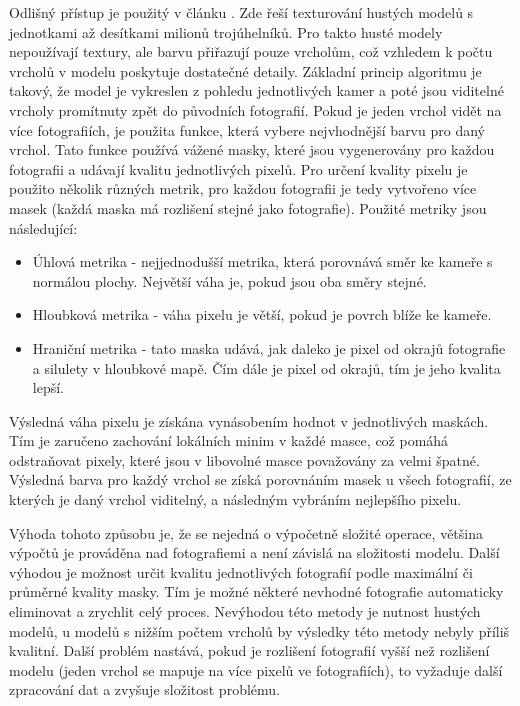 \documentclass[11pt,twoside,a4paper]{book}
\begin{document}
Odlišný přístup je použitý v článku \cite{masked-blending}. Zde řeší texturování
hustých modelů s jednotkami až desítkami milionů trojúhelníků. Pro takto husté
modely nepoužívají textury, ale barvu přiřazují pouze vrcholům, což vzhledem k
počtu vrcholů v modelu poskytuje dostatečné detaily. Základní princip algoritmu
je takový, že model je vykreslen z pohledu jednotlivých kamer a poté jsou
viditelné vrcholy promítnuty zpět do původních fotografií. Pokud je jeden vrchol
vidět na více fotografiích, je použita funkce, která vybere nejvhodnější barvu
pro daný vrchol. Tato funkce používá vážené masky, které jsou vygenerovány pro
každou fotografii a udávají kvalitu jednotlivých pixelů. Pro určení kvality
pixelu je použito několik různých metrik, pro každou fotografii je tedy
vytvořeno více masek (každá maska má rozlišení stejné jako fotografie). Použité
metriky jsou následující:
\begin{itemize}
  \item Úhlová metrika - nejjednodušší metrika, která porovnává směr ke kameře s 
  		normálou plochy. Největší váha je, pokud jsou oba směry stejné.
  \item Hloubková metrika - váha pixelu je větší, pokud je povrch blíže ke 
  		kameře.
  \item Hraniční metrika - tato maska udává, jak daleko je pixel od okrajů 
  		fotografie a silulety v hloubkové mapě. Čím dále je pixel od okrajů, 
  		tím je jeho kvalita lepší.
\end{itemize}
Výsledná váha pixelu je získána vynásobením hodnot v jednotlivých maskách. Tím 
je zaručeno zachování lokálních minim v každé masce, což pomáhá odstraňovat 
pixely, které jsou v libovolné masce považovány za velmi špatné. Výsledná barva 
pro každý vrchol se získá porovnáním masek u všech fotografií, ze kterých je daný 
vrchol viditelný, a následným vybráním nejlepšího pixelu.

Výhoda tohoto způsobu je, že se nejedná o výpočetně složité operace, většina
výpočtů je prováděna nad fotografiemi a není závislá na složitosti modelu. Další
výhodou je možnost určit kvalitu jednotlivých fotografií podle maximální či
průměrné kvality masky. Tím je možné některé nevhodné fotografie automaticky
eliminovat a zrychlit celý proces. Nevýhodou této metody je nutnost hustých
modelů, u modelů s nižším počtem vrcholů by výsledky této metody nebyly příliš
kvalitní. Další problém nastává, pokud je rozlišení fotografií vyšší než
rozlišení modelu (jeden vrchol se mapuje na více pixelů ve fotografiích), to
vyžaduje další zpracování dat a zvyšuje složitost problému.
\end{document}
